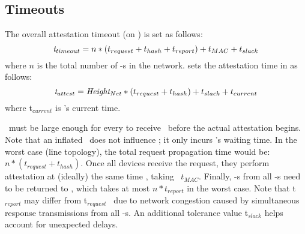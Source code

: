 \subsection{Timeouts}\label{section:timeout}
%
The overall attestation timeout (on \vrf) is set as follows:
\begin{equation}\label{eq:t-overall}
    \textit{t$_{timeout}$} = n * (t_{request}+t_{hash} + t_{report}) + t_{MAC} + t_{slack}
\end{equation}
where $n$ is the total number of \prv-s in the network.
\vrf sets the attestation time in \trapsrtc as follows:
\begin{equation}\label{eq:t-attestation}    
    \textit{t$_{attest}$} = \textit{Height$_{Net}$} * (t_{request}+t_{hash})+t_{slack}+t_{current}
\end{equation}
where t$_{current}$ is \vrf's current time.

\attesttime\ must be large enough for every \prv to receive \Attreq\
before the actual attestation begins.
Note that an inflated \attesttime\ does not influence \toctousa; it only incurs \vrf's waiting time.
In the worst case (line topology), the total request propagation time would be: $n*(t_{request}+t_{hash})$.
Once all devices receive the request, they perform attestation at (ideally) the 
same time \attesttime, taking \ $t_{MAC}$. Finally, \Attrep-s from all \prv-s 
need to be returned to \vrf, which takes at most $n*t_{report}$ in the worst case. 
Note that t$_{report}$ may differ from t$_{request}$ \ due to network congestion caused by 
simultaneous response transmissions from all \prv-s. An additional tolerance
value t$_{slack}$ helps account for unexpected delays.